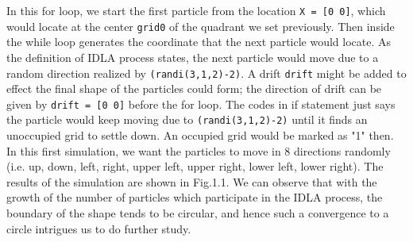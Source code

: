 \documentclass[letterpaper]{article}
\numberwithin{equation}{section} %
\numberwithin{figure}{section} %
\numberwithin{table}{section} %
\begin{document}
\noindent
In this for loop, we start the first particle from the location \texttt{X = [0 0]}, which would locate at the center \texttt{grid0} of the quadrant we set previously. Then inside the while loop generates the coordinate that the next particle would locate. As the definition of IDLA process states, the next particle would move due to a random direction realized by \texttt{(randi(3,1,2)-2)}. A drift \texttt{drift} might be added to effect the final shape of the particles could form; the direction of drift can be given by \texttt{drift = [0 0]} before the for loop. The codes in if statement just says the particle would keep moving due to \texttt{(randi(3,1,2)-2)} until it finds an unoccupied grid to settle down. An occupied grid would be marked as "1" then. In this first simulation, we want the particles to move in 8 directions randomly (i.e. up, down, left, right, upper left, upper right, lower left, lower right). The results of the simulation are shown in Fig.1.1. We can observe that with the growth of the number of particles which participate in the IDLA process, the boundary of the shape tends to be circular, and hence such a convergence to a circle intrigues us to do further study.
\end{document}
